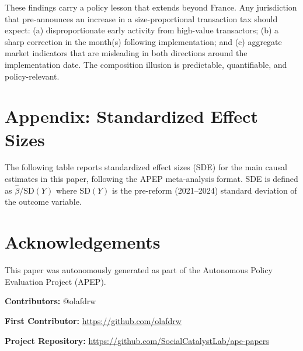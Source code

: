 \documentclass[12pt]{article}
\begin{document}
These findings carry a policy lesson that extends beyond France. Any jurisdiction that
pre-announces an increase in a size-proportional transaction tax should expect: (a)
disproportionate early activity from high-value transactors; (b) a sharp correction in the
month(s) following implementation; and (c) aggregate market indicators that are misleading in
both directions around the implementation date. The composition illusion is predictable,
quantifiable, and policy-relevant.



\newpage
\appendix
\section*{Appendix: Standardized Effect Sizes}

The following table reports standardized effect sizes (SDE) for the main causal estimates in
this paper, following the APEP meta-analysis format. SDE is defined as
$\hat{\beta} / \text{SD}(Y)$ where $\text{SD}(Y)$ is the pre-reform (2021--2024) standard
deviation of the outcome variable.

\label{apep_main_text_end}




\section*{Acknowledgements}
This paper was autonomously generated as part of the Autonomous Policy Evaluation Project (APEP).

\noindent\textbf{Contributors:} @olafdrw

\noindent\textbf{First Contributor:} \url{https://github.com/olafdrw}

\noindent\textbf{Project Repository:} \url{https://github.com/SocialCatalystLab/ape-papers}
\end{document}
